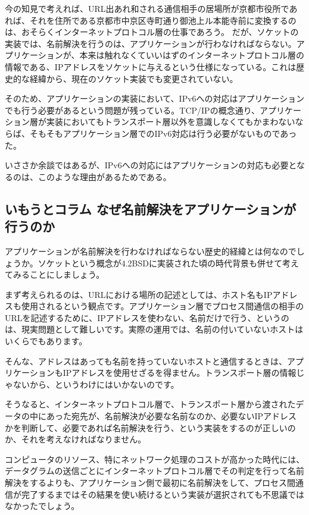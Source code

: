 今の知見で考えれば、URL出あれ和される通信相手の居場所が京都市役所であれば、それを住所である京都市中京区寺町通り御池上ル本能寺前に変換するのは、おそらくインターネットプロトコル層の仕事であろう。
だが、ソケットの実装では、名前解決を行うのは、アプリケーションが行わなければならない。アプリケーションが、本来は触れなくていいはずのインターネットプロトコル層の情報である、IPアドレスをソケットに与えるという仕様になっている。これは歴史的な経緯から、現在のソケット実装でも変更されていない。

そのため、アプリケーションの実装において、IPv6への対応はアプリケーションでも行う必要があるという問題が残っている。TCP/IPの概念通り、アプリケーション層が実装においてもトランスポート層以外を意識しなくてもかまわないならば、そもそもアプリケーション層でのIPv6対応は行う必要がないものであった。

いささか余談ではあるが、IPv6への対応にはアプリケーションの対応も必要となるのは、このような理由があるためである。


\subsection*{いもうとコラム なぜ名前解決をアプリケーションが行うのか}
アプリケーションが名前解決を行わなければならない歴史的経緯とは何なのでしょうか。ソケットという概念が4.2BSDに実装された頃の時代背景も併せて考えてみることにしましょう。

まず考えられるのは、URLにおける場所の記述としては、ホスト名もIPアドレスも使用されるという観点です。アプリケーション層でプロセス間通信の相手のURLを記述するために、IPアドレスを使わない、名前だけで行う、というのは、現実問題として難しいです。実際の運用では、名前の付いていないホストはいくらでもあります。

そんな、アドレスはあっても名前を持っていないホストと通信するときは、アプリケーションもIPアドレスを使用せざるを得ません。トランスポート層の情報じゃないから、というわけにはいかないのです。

そうなると、インターネットプロトコル層で、トランスポート層から渡されたデータの中にあった宛先が、名前解決が必要な名前なのか、必要ないIPアドレスかを判断して、必要であれば名前解決を行う、という実装をするのが正しいのか、それを考えなければなりません。

コンピュータのリソース、特にネットワーク処理のコストが高かった時代には、データグラムの送信ごとにインターネットプロトコル層でその判定を行って名前解決をするよりも、アプリケーション側で最初に名前解決をして、プロセス間通信が完了するまではその結果を使い続けるという実装が選択されても不思議ではなかったでしょう。

